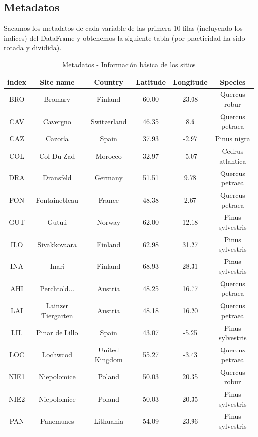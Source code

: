 \documentclass[a4paper,11pt]{article}
\begin{document}
\subsection*{Metadatos}

Sacamos los metadatos de cada variable de las primera 10 filas (incluyendo los
indices) del DataFrame y obtenemos la siguiente tabla (por practicidad ha sido
rotada y dividida).

\begin{table}[ht]
	\centering
	\caption{Metadatos - Información básica de los sitios}
	\label{tab:metadatos1}
	\begin{tabular}{|c|c|c|c|c|c|}
		\hline
		index & Site name & Country & Latitude & Longitude & Species \\
		\hline
		BRO & Bromarv & Finland & 60.00 & 23.08 & Quercus robur \\
		CAV & Cavergno & Switzerland & 46.35 & 8.6 & Quercus petraea \\
		CAZ & Cazorla & Spain & 37.93 & -2.97 & Pinus nigra \\
		COL & Col Du Zad & Morocco & 32.97 & -5.07 & Cedrus atlantica \\
		DRA & Dransfeld & Germany & 51.51 & 9.78 & Quercus petraea \\
		FON & Fontainebleau & France & 48.38 & 2.67 & Quercus petraea \\
		GUT & Gutuli & Norway & 62.00 & 12.18 & Pinus sylvestris \\
		ILO & Sivakkovaara & Finland & 62.98 & 31.27 & Pinus sylvestris \\
		INA & Inari & Finland & 68.93 & 28.31 & Pinus sylvestris \\
		AHI & Perchtold... & Austria & 48.25 & 16.77 & Quercus petraea \\
		LAI & Lainzer Tiergarten & Austria & 48.18 & 16.20 & Quercus petraea \\
		LIL & Pinar de Lillo & Spain & 43.07 & -5.25 & Pinus sylvestris \\
		LOC & Lochwood & United Kingdom & 55.27 & -3.43 & Quercus petraea \\
		NIE1 & Niepolomice & Poland & 50.03 & 20.35 & Quercus robur \\
		NIE2 & Niepolomice & Poland & 50.03 & 20.35 & Pinus sylvestris \\
		PAN & Panemunes & Lithuania & 54.09 & 23.96 & Pinus sylvestris \\

\end{tabular}
\end{table}
\end{document}
